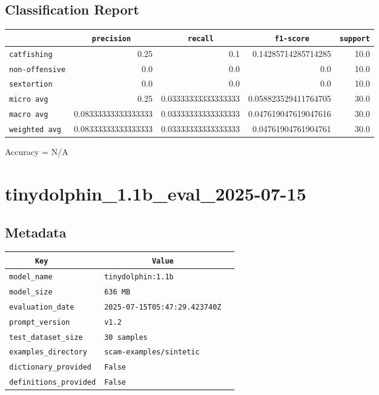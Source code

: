 \documentclass{article}
\begin{document}
\subsection{Classification Report}

\begin{center}
\begin{tabular}{l | r | r | r | r} \hline
    \verb|            | & \verb|    precision     | & \verb|      recall      | & \verb|     f1-score     | & \verb|support| \\ \hline
    \hline
    \verb|catfishing | & 0.25 & 0.1 & 0.14285714285714285 &    10.0 \\ \hline
    \verb|non-offensive| & 0.0 & 0.0 & 0.0 &    10.0 \\ \hline
    \verb|sextortion | & 0.0 & 0.0 & 0.0 &    10.0 \\ \hline
    \verb|micro avg  | & 0.25 & 0.03333333333333333 & 0.058823529411764705 &    30.0 \\ \hline
    \verb|macro avg  | & 0.08333333333333333 & 0.03333333333333333 & 0.047619047619047616 &    30.0 \\ \hline
    \verb|weighted avg| & 0.08333333333333333 & 0.03333333333333333 & 0.04761904761904761 &    30.0 \\ \hline
\end{tabular}
\end{center}

\begin{center}
Accuracy = N/A
\end{center}

\section{tinydolphin\_1.1b\_eval\_2025-07-15}
\subsection{Metadata}

\begin{center}
\begin{tabular}{l | l} \hline
    \verb|      Key      | & \verb|           Value           | \\ \hline
    \hline
    \verb|model_name    | & \verb|tinydolphin:1.1b             | \\ \hline
    \verb|model_size    | & \verb|636 MB                       | \\ \hline
    \verb|evaluation_date| & \verb|2025-07-15T05:47:29.423740Z  | \\ \hline
    \verb|prompt_version| & \verb|v1.2                         | \\ \hline
    \verb|test_dataset_size| & \verb|30 samples                   | \\ \hline
    \verb|examples_directory| & \verb|scam-examples/sintetic       | \\ \hline
    \verb|dictionary_provided| & \verb|False                        | \\ \hline
    \verb|definitions_provided| & \verb|False                        | \\ \hline
\end{tabular}
\end{center}
\end{document}
